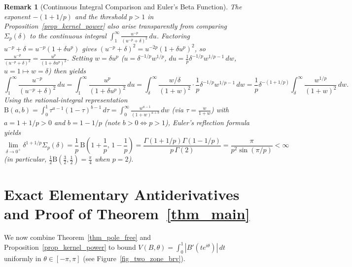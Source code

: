 \documentclass[11pt,reqno]{amsart}
\newtheorem{rem}[thm]{Remark}
\numberwithin{equation}{section}
\begin{document}
\begin{rem}[Continuous Integral Comparison and Euler's Beta Function] \label{rem_beta_integral}
\normalfont
The exponent $-(1 + 1/p)$ and the threshold $p > 1$ in Proposition~\ref{prop_kernel_power} also arise transparently from comparing $\Sigma_p(\delta)$ to the continuous integral $\int_1^\infty \frac{u^{-p}}{(u^{-p} + \delta)^2}\,du$. Factoring $u^{-p} + \delta = u^{-p}(1 + \delta u^p)$ gives $(u^{-p} + \delta)^2 = u^{-2p}(1 + \delta u^p)^2$, so $\frac{u^{-p}}{(u^{-p} + \delta)^2} = \frac{u^p}{(1 + \delta u^p)^2}$. Setting $w = \delta u^p$ ($u = \delta^{-1/p} w^{1/p}$, $du = \frac{1}{p}\delta^{-1/p} w^{1/p - 1}\,dw$, $u = 1 \mapsto w = \delta$) then yields
\[
  \int_1^\infty \frac{u^{-p}}{(u^{-p} + \delta)^2}\,du
  = \int_1^\infty \frac{u^p}{(1 + \delta u^p)^2}\,du
  = \int_\delta^\infty \frac{w/\delta}{(1 + w)^2} \cdot \frac{1}{p}\delta^{-1/p} w^{1/p - 1}\,dw
  = \frac{1}{p}\delta^{-(1 + 1/p)} \int_\delta^\infty \frac{w^{1/p}}{(1 + w)^2}\,dw.
\]
Using the rational-integral representation $\mathrm{B}(a, b) = \int_0^1 \tau^{a-1}(1 - \tau)^{b-1}\,d\tau = \int_0^\infty \frac{w^{a-1}}{(1 + w)^{a + b}}\,dw$ (via $\tau = \frac{w}{1 + w}$) with $a = 1 + 1/p > 0$ and $b = 1 - 1/p$ (note $b > 0 \iff p > 1$), Euler's reflection formula yields
\[
  \lim_{\delta \to 0^+} \delta^{1 + 1/p} \Sigma_p(\delta)
  = \frac{1}{p}\,\mathrm{B}\!\left(1 + \frac{1}{p},\, 1 - \frac{1}{p}\right)
  = \frac{\Gamma(1 + 1/p)\Gamma(1 - 1/p)}{p\,\Gamma(2)}
  = \frac{\pi}{p^2 \sin(\pi / p)} < \infty
\]
(in particular, $\frac{1}{2}\mathrm{B}(\frac{3}{2}, \frac{1}{2}) = \frac{\pi}{4}$ when $p = 2$).
\end{rem}

\section{Exact Elementary Antiderivatives and Proof of Theorem~\ref{thm_main}} \label{sec_two_zone}

We now combine Theorem~\ref{thm_pole_free} and Proposition~\ref{prop_kernel_power} to bound $V(B, \theta) = \int_0^1 |B'(t e^{i\theta})|\,dt$ uniformly in $\theta \in [-\pi, \pi]$ (see Figure~\ref{fig_two_zone_brv}).
\end{document}
